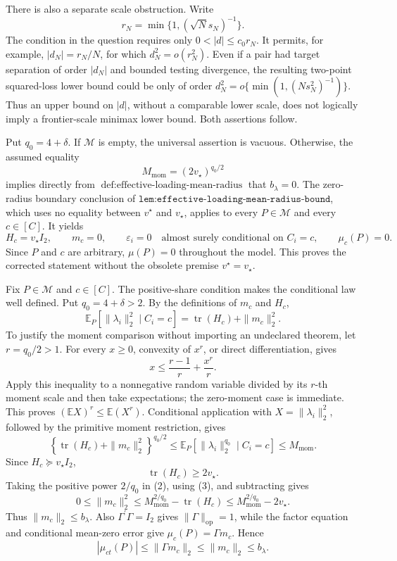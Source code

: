There is also a separate scale obstruction. Write
\[
r_N=\min\{1,(\sqrt N s_N)^{-1}\}.
\]
The condition in the question requires only \(0<|d|\leq c_0r_N\). It permits, for example, \(|d_N|=r_N/N\), for which \(d_N^2=o(r_N^2)\). Even if a pair had target separation of order \(|d_N|\) and bounded testing divergence, the resulting two-point squared-loss lower bound could be only of order \(d_N^2=o\{\min(1,(Ns_N^2)^{-1})\}\). Thus an upper bound on \(|d|\), without a comparable lower scale, does not logically imply a frontier-scale minimax lower bound. Both assertions follow.

Put \(q_0=4+\delta\). If \(\mathcal M\) is empty, the universal assertion is vacuous. Otherwise, the assumed equality
\[
M_{\mathrm{mom}}=(2v_\star)^{q_0/2}
\]
implies directly from \(\operatorname{def:effective\text{-}loading\text{-}mean\text{-}radius}\) that \(b_\lambda=0\). The zero-radius boundary conclusion of \(\texttt{lem:effective-loading-mean-radius-bound}\), which uses no equality between \(v^{\star}\) and \(v_\star\), applies to every \(P\in\mathcal M\) and every \(c\in[C]\). It yields
\[
H_c=v_\star I_2,
\qquad
m_c=0,
\qquad
\varepsilon_i=0\quad\text{almost surely conditional on }C_i=c,
\qquad
\mu_c(P)=0.
\]
Since \(P\) and \(c\) are arbitrary, \(\mu(P)=0\) throughout the model. This proves the corrected statement without the obsolete premise \(v^{\star}=v_\star\).

Fix \(P\in\mathcal M\) and \(c\in[C]\). The positive-share condition makes the conditional law well defined. Put \(q_0=4+\delta>2\). By the definitions of \(m_c\) and \(H_c\),
\[
\mathbb E_P[\|\lambda_i\|_2^2\mid C_i=c]
=\operatorname{tr}(H_c)+\|m_c\|_2^2.
\tag{1}
\]
To justify the moment comparison without importing an undeclared theorem, let \(r=q_0/2>1\). For every \(x\geq0\), convexity of \(x^r\), or direct differentiation, gives
\[
x\leq\frac{r-1}{r}+\frac{x^r}{r}.
\]
Apply this inequality to a nonnegative random variable divided by its \(r\)-th moment scale and then take expectations; the zero-moment case is immediate. This proves \((\mathbb EX)^r\leq\mathbb E(X^r)\). Conditional application with \(X=\|\lambda_i\|_2^2\), followed by the primitive moment restriction, gives
\[
\left\{\operatorname{tr}(H_c)+\|m_c\|_2^2\right\}^{q_0/2}
\leq\mathbb E_P[\|\lambda_i\|_2^{q_0}\mid C_i=c]
\leq M_{\mathrm{mom}}.
\tag{2}
\]
Since \(H_c\succeq v_\star I_2\),
\[
\operatorname{tr}(H_c)\geq2v_\star.
\tag{3}
\]
Taking the positive power \(2/q_0\) in (2), using (3), and subtracting gives
\[
0\leq\|m_c\|_2^2
\leq M_{\mathrm{mom}}^{2/q_0}-\operatorname{tr}(H_c)
\leq M_{\mathrm{mom}}^{2/q_0}-2v_\star.
\tag{4}
\]
Thus \(\|m_c\|_2\leq b_\lambda\). Also \(\Gamma^{\prime}\Gamma=I_2\) gives \(\|\Gamma\|_{\mathrm{op}}=1\), while the factor equation and conditional mean-zero error give \(\mu_c(P)=\Gamma m_c\). Hence
\[
|\mu_{ct}(P)|
\leq\|\Gamma m_c\|_2
\leq\|m_c\|_2
\leq b_\lambda.
\tag{5}
\]

